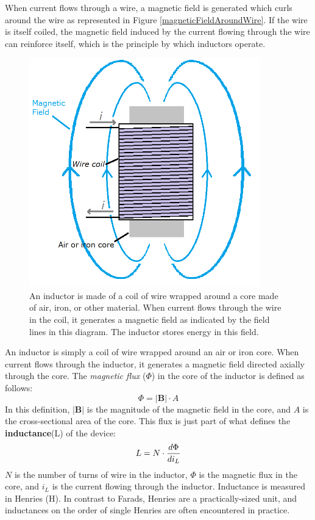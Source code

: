 When current flows through a wire, a magnetic field is generated which curls around the wire as represented in Figure \ref{magneticFieldAroundWire}. If the wire is itself coiled, the magnetic field induced by the current flowing through the wire can reinforce itself, which is the principle by which inductors operate.
\begin{figure}[h!]
\centering
\includegraphics[width=10cm]{figures/inductorAnnotated.png}
\caption{An inductor is made of a coil of wire wrapped around a core made of air, iron, or other material. When current flows through the wire in the coil, it generates a magnetic field as indicated by the field lines in this diagram. The inductor stores energy in this field.}
\label{inductorInDetail}
\end{figure}
An inductor is simply a coil of wire wrapped around an air or iron core. When current flows through the inductor, it generates a magnetic field directed axially through the core. The \textit{magnetic flux} ($\Phi$) in the core of the inductor is defined as follows:
$$
\Phi = |\mathbf{B}| \cdot A
$$
In this definition, $|\mathbf{B}|$ is the magnitude of the magnetic field in the core, and $A$ is the cross-sectional area of the core. This flux is just part of what defines the \textbf{inductance}(L) of the device:
$$
L = N\cdot\frac{\mathnormal{d}\Phi}{\mathnormal{d}i_L}
$$
$N$ is the number of turns of wire in the inductor, $\Phi$ is the magnetic flux in the core, and $i_L$ is the current flowing through the inductor. Inductance is measured in Henries (H). In contrast to Farads, Henries are a practically-sized unit, and inductances on the order of single Henries are often encountered in practice.
